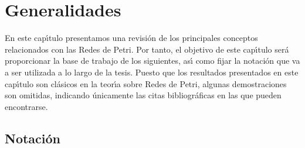 \chapter{Generalidades}

En este cap\'{\i}tulo presentamos una revisi\'{o}n de los principales
conceptos relacionados con las Redes de Petri.
Por tanto, el objetivo de este cap\'{\i}tulo ser\'{a} proporcionar
la base de trabajo de los siguientes, as\'{\i} como fijar la
notaci\'{o}n que va a ser utilizada a lo largo de la tesis.
Puesto que los
resultados presentados en este cap\'{\i}tulo son cl\'{a}sicos en la
teor\'{\i}a sobre Redes de Petri, algunas demostraciones son
omitidas, indicando \'{u}nicamente las citas bibliogr\'{a}ficas en las que
pueden encontrarse.

\section{Notaci\'{o}n}


